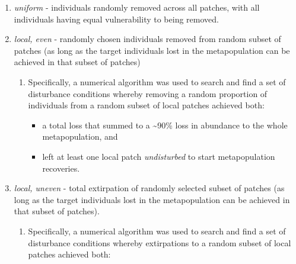 \documentclass[
]{article}
\providecommand{\tightlist}{%
  \setlength{\itemsep}{0pt}\setlength{\parskip}{0pt}}
\begin{document}
\begin{enumerate}
  \begin{enumerate}
  \def\labelenumii{\alph{enumii}.}
  \tightlist
  \item
    \emph{uniform} - individuals randomly removed across all patches,
    with all individuals having equal vulnerability to being removed.
  \item
    \emph{local, even} - randomly chosen individuals removed from random
    subset of patches (as long as the target individuals lost in the
    metapopulation can be achieved in that subset of patches)

    \begin{enumerate}
    \def\labelenumiii{\roman{enumiii}.}
    \tightlist
    \item
      Specifically, a numerical algorithm was used to search and find a
      set of disturbance conditions whereby removing a random proportion
      of individuals from a random subset of local patches achieved
      both:

      \begin{itemize}
      \tightlist
      \item
        a total loss that summed to a \textasciitilde90\% loss in
        abundance to the whole metapopulation, and
      \item
        left at least one local patch \emph{undisturbed} to start
        metapopulation recoveries.
      \end{itemize}
    \end{enumerate}
  \item
    \emph{local, uneven} - total extirpation of randomly selected subset
    of patches (as long as the target individuals lost in the
    metapopulation can be achieved in that subset of patches).

    \begin{enumerate}
    \def\labelenumiii{\roman{enumiii}.}
    \tightlist
    \item
      Specifically, a numerical algorithm was used to search and find a
      set of disturbance conditions whereby extirpations to a random
      subset of local patches achieved both:


\end{enumerate}
\end{enumerate}
\end{enumerate}
\end{document}
